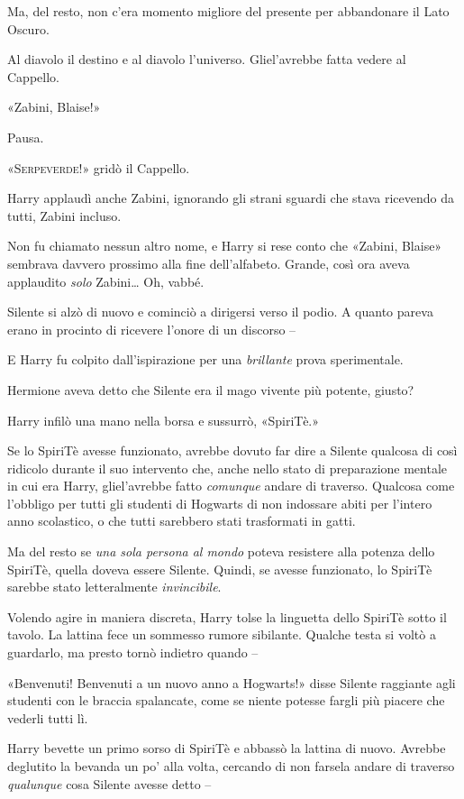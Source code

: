 Ma, del resto, non c’era momento migliore del presente per abbandonare il Lato Oscuro.

Al diavolo il destino e al diavolo l’universo. Gliel’avrebbe fatta vedere al Cappello.

«Zabini, Blaise!»

Pausa.

«\textsc{Serpeverde!}» gridò il Cappello.

Harry applaudì anche Zabini, ignorando gli strani sguardi che stava ricevendo da tutti, Zabini incluso.

Non fu chiamato nessun altro nome, e Harry si rese conto che «Zabini, Blaise» sembrava davvero prossimo alla fine dell’alfabeto. Grande, così ora aveva applaudito \textit{solo} Zabini… Oh, vabbé.

Silente si alzò di nuovo e cominciò a dirigersi verso il podio. A quanto pareva erano in procinto di ricevere l’onore di un discorso –

E Harry fu colpito dall’ispirazione per una \textit{brillante} prova sperimentale.

Hermione aveva detto che Silente era il mago vivente più potente, giusto?

Harry infilò una mano nella borsa e sussurrò, «SpiriTè.»

Se lo SpiriTè avesse funzionato, avrebbe dovuto far dire a Silente qualcosa di così ridicolo durante il suo intervento che, anche nello stato di preparazione mentale in cui era Harry, gliel’avrebbe fatto \textit{comunque} andare di traverso. Qualcosa come l’obbligo per tutti gli studenti di Hogwarts di non indossare abiti per l’intero anno scolastico, o che tutti sarebbero stati trasformati in gatti.

Ma del resto se \textit{una sola persona al mondo} poteva resistere alla potenza dello SpiriTè, quella doveva essere Silente. Quindi, se avesse funzionato, lo SpiriTè sarebbe stato letteralmente \textit{invincibile}.

Volendo agire in maniera discreta, Harry tolse la linguetta dello SpiriTè sotto il tavolo. La lattina fece un sommesso rumore sibilante. Qualche testa si voltò a guardarlo, ma presto tornò indietro quando –

«Benvenuti! Benvenuti a un nuovo anno a Hogwarts!» disse Silente raggiante agli studenti con le braccia spalancate, come se niente potesse fargli più piacere che vederli tutti lì.

Harry bevette un primo sorso di SpiriTè e abbassò la lattina di nuovo. Avrebbe deglutito la bevanda un po’ alla volta, cercando di non farsela andare di traverso \textit{qualunque} cosa Silente avesse detto –

